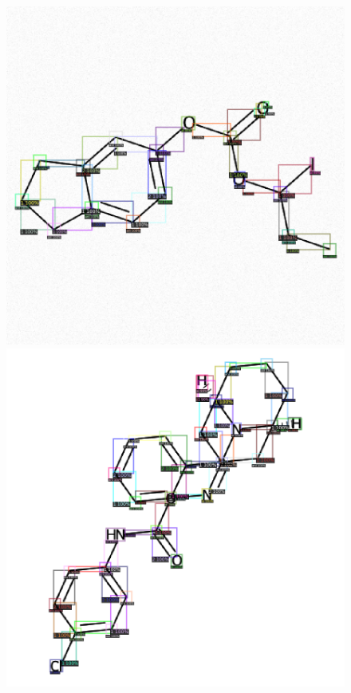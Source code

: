 \begin{figure}[h!] 
	\center
	\includegraphics [scale=0.25] {my_folder/images/inference1}
	\includegraphics [scale=0.25] {my_folder/images/inference2}

\end{figure}
